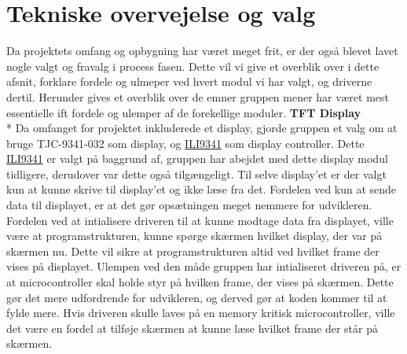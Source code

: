 \graphicspath{{Chapters/Alternative/}}


\section{Tekniske overvejelse og valg}


Da projektets omfang og opbygning har været meget frit, er der også blevet lavet nogle valgt og fravalg i process fasen. Dette vil vi give et overblik over i dette afsnit, forklare fordele og ulmeper ved hvert modul vi har valgt, og driverne dertil. Herunder gives et overblik over de emner gruppen mener har været mest essentielle ift fordele og ulemper af de forekellige moduler. 
\newline
\newline
\textbf{TFT Display} \\*
Da omfanget for projektet inkluderede et display, gjorde gruppen et valg om at bruge TJC-9341-032 som display, og \href{https://blackboard.au.dk/bbcswebdav/pid-1697983-dt-content-rid-3847230_1/courses/BB-Cou-UUVA-73302/BB-Cou-UUVA-65758_ImportedContent_20170106021228/BB-Cou-STADS-UUVA-52360_ImportedContent_20160107025559/LAB/Lab3a%20Graphic%20LCD%20Display/Files%20for%20LAB3a/ILI9341_v1.11.pdf}{ILI9341} 
som display controller. Dette \href{https://blackboard.au.dk/bbcswebdav/pid-1697983-dt-content-rid-3847230_1/courses/BB-Cou-UUVA-73302/BB-Cou-UUVA-65758_ImportedContent_20170106021228/BB-Cou-STADS-UUVA-52360_ImportedContent_20160107025559/LAB/Lab3a%20Graphic%20LCD%20Display/Files%20for%20LAB3a/ILI9341_v1.11.pdf}{ILI9341} 
er valgt på baggrund af, gruppen har abejdet med dette display modul tidligere, derudover var dette også tilgængeligt.
Til selve display'et er der valgt kun at kunne skrive til display'et og ikke læse fra det. Fordelen ved kun at sende data til displayet, er at det gør opsætningen meget nemmere for udvikleren. \\
Fordelen ved at intialisere driveren til at kunne modtage data fra displayet, ville være at programstrukturen, kunne spørge skærmen hvilket display, der var på skærmen nu. Dette vil sikre at programstrukturen altid ved hvilket frame der vises på displayet. Ulempen ved den måde gruppen har intialiseret driveren på, er at microcontroller skal holde styr på hvilken frame, der vises på skærmen. Dette gør det mere udfordrende for udvikleren, og derved gør at koden kommer til at fylde mere. Hvis driveren skulle laves på en memory kritisk microcontroller, ville det være en fordel at tilføje skærmen at kunne læse hvilket frame der står på skærmen. \\
